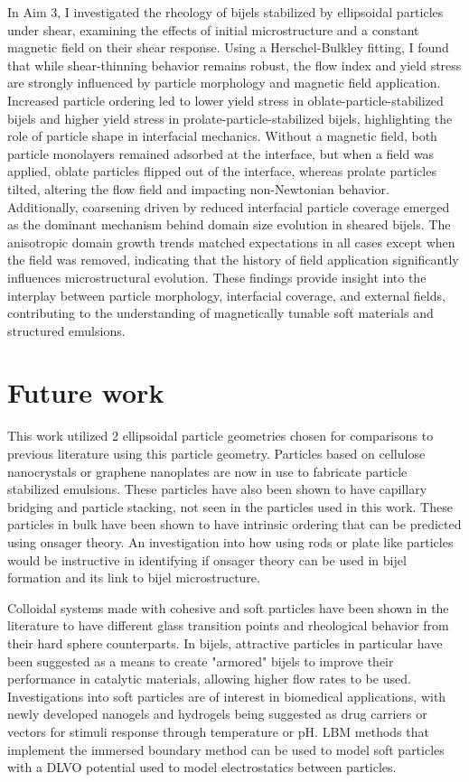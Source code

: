 In Aim 3, I investigated the rheology of bijels stabilized by ellipsoidal particles under shear, examining the effects of initial microstructure and a 
constant magnetic field on their shear response. Using a Herschel-Bulkley fitting, I found that while shear-thinning behavior remains robust, the 
flow index and yield stress are strongly influenced by particle morphology and magnetic field application. Increased particle ordering led to 
lower yield stress in oblate-particle-stabilized bijels and higher yield stress in prolate-particle-stabilized bijels, highlighting the role of particle 
shape in interfacial mechanics. Without a magnetic field, both particle monolayers remained adsorbed at the interface, but when a field was applied, 
oblate particles flipped out of the interface, whereas prolate particles tilted, altering the flow field and impacting non-Newtonian behavior. Additionally, 
coarsening driven by reduced interfacial particle coverage emerged as the dominant mechanism behind domain size evolution in sheared bijels. The anisotropic 
domain growth trends matched expectations in all cases except when the field was removed, indicating that the history of field application significantly influences 
microstructural evolution. These findings provide insight into the interplay between particle morphology, interfacial coverage, and external fields, contributing 
to the understanding of magnetically tunable soft materials and structured emulsions.

\section{Future work}

This work utilized 2 ellipsoidal particle geometries chosen for comparisons to previous literature using this 
particle geometry. Particles based on cellulose nanocrystals or graphene nanoplates are now in use to fabricate
particle stabilized emulsions. These particles have also been shown to have capillary bridging and particle stacking,
not seen in the particles used in this work. These particles in bulk have been shown to have intrinsic ordering
that can be predicted using onsager theory. An investigation into how using rods or plate like particles would be 
instructive in identifying if onsager theory can be used in bijel formation and its link to bijel microstructure. 
\cite{tan_2d_2021}

Colloidal systems made with cohesive and soft particles have been shown in the literature to have different glass 
transition points and rheological behavior from their hard sphere counterparts. In bijels, attractive particles in 
particular have been suggested as a means to create "armored" bijels to improve their performance in catalytic materials, 
allowing higher flow rates to be used. Investigations into soft particles are of interest in biomedical
applications, with newly developed nanogels and hydrogels being suggested as drug carriers or vectors for stimuli 
response through temperature or pH. LBM methods that implement the immersed boundary method can be used to model soft
particles with a DLVO potential used to model electrostatics between particles. \cite{silva_lattice_2024}

